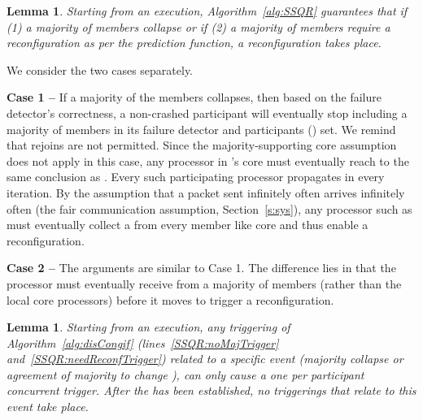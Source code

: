 \documentclass[11pt]{article}
\newtheorem{lemma}[theorem]{Lemma}
\newenvironment{proof}{\noindent{\bf Proof.}}{\hfill}
\begin{document}
\begin{lemma}
\label{thQ:triggeredWhenNeeded}
Starting from an  execution, Algorithm~\ref{alg:SSQR} guarantees that if (1) a majority of  members collapse or if (2) a majority of members require a reconfiguration as per the prediction function, a reconfiguration takes place.
\end{lemma}

\begin{proof} We consider the two cases separately.

\noindent \textbf{Case 1 --} 
If a majority of the members collapses, then based on the failure detector's correctness, a non-crashed participant  will eventually stop including a majority of  members in its failure detector and participants () set.
We remind that rejoins are not permitted.
Since the majority-supporting core assumption does not apply in this case, any processor in 's core must eventually reach to the same conclusion as .
Every such participating processor  propagates  in every iteration. 
By the assumption that a packet sent infinitely often arrives infinitely often (the fair communication assumption, Section~\ref{s:sys}), any processor such as  must eventually collect a  from every member like  core and thus enable a reconfiguration.

\noindent \textbf{Case 2 --} 
The arguments are similar to Case 1. 
The difference lies in that the processor  must eventually receive  from a majority of  members (rather than the local core processors) before it moves to  trigger a reconfiguration.
\end{proof}


\begin{lemma}
\label{thQ:triggersControlled}
Starting from an  execution, any triggering of Algorithm~\ref{alg:disCongif} (lines~\ref{SSQR:noMajTrigger} and~\ref{SSQR:needReconfTrigger}) related to a specific event (majority collapse or agreement of majority to change ), can only cause a one per participant concurrent trigger. After the  has been established, no triggerings that relate to this event take place.
\end{lemma}
\end{document}
